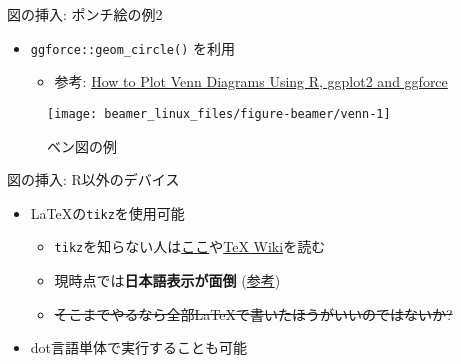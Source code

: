 \documentclass[
  12pt,
  ignorenonframetext,
]{beamer}
\providecommand{\tightlist}{%
  \setlength{\itemsep}{0pt}\setlength{\parskip}{0pt}}
\begin{document}
\begin{frame}[fragile]{図の挿入: ポンチ絵の例2}
\protect\hypertarget{ux56f3ux306eux633fux5165-ux30ddux30f3ux30c1ux7d75ux306eux4f8b2}{}

\begin{itemize}
\tightlist
\item
  \texttt{ggforce::geom\_circle()} を利用

  \begin{itemize}
  \tightlist
  \item
    参考:
    \href{https://scriptsandstatistics.wordpress.com/2018/04/26/how-to-plot-venn-diagrams-using-r-ggplot2-and-ggforce/}{How
    to Plot Venn Diagrams Using R, ggplot2 and ggforce}
  \end{itemize}
\end{itemize}

\begin{figure}

{\centering \texttt{[image: beamer\_linux\_files/figure-beamer/venn-1]} 

}

\caption{ベン図の例}\label{fig:venn}
\end{figure}

\end{frame}

\begin{frame}[fragile]{図の挿入: R以外のデバイス}
\protect\hypertarget{ux56f3ux306eux633fux5165-rux4ee5ux5916ux306eux30c7ux30d0ux30a4ux30b9}{}

\begin{itemize}
\tightlist
\item
  \LaTeX の\texttt{tikz}を使用可能

  \begin{itemize}
  \tightlist
  \item
    \texttt{tikz}を知らない人は\href{https://www.opt.mist.i.u-tokyo.ac.jp/~tasuku/tikz.html}{ここ}や\href{https://texwiki.texjp.org/?TikZ}{TeX
    Wiki}を読む
  \item
    現時点では\textbf{日本語表示が面倒}
    (\href{https://stackoverflow.com/questions/51689570/how-to-force-tikz-in-rmarkdown-document-to-show-cyrillic-text}{参考})
  \item
    \sout{そこまでやるなら全部\LaTeX で書いたほうがいいのではないか?}
  \end{itemize}
\item
  dot言語単体で実行することも可能
\end{itemize}

\end{frame}
\end{document}

